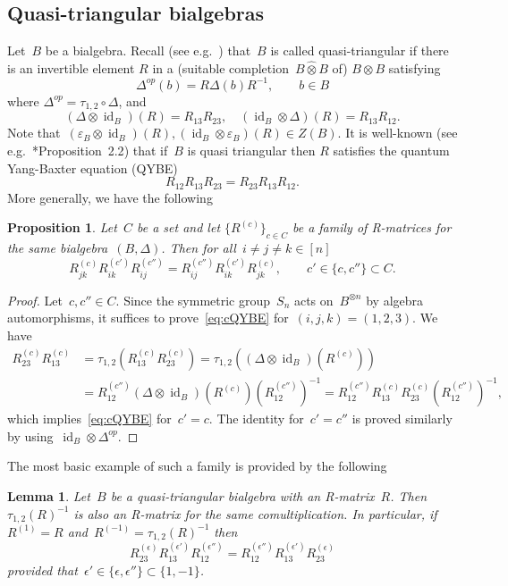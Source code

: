 \documentclass[12pt, reqno]{amsart}
\newcommand{\wh}[1]{\widehat{#1}}
\newtheorem{lemma}[theorem]{Lemma}
\newtheorem{proposition}[theorem]{Proposition}
\theoremstyle{definition}
\numberwithin{equation}{section}
\newcommand{\tensor}{\otimes}
\DeclareMathOperator{\id}{id}
\begin{document}
\subsection{Quasi-triangular bialgebras}
Let~$B$ be a bialgebra. Recall (see e.g.~\cites{Drinf,CPbook,RSTS,Majid}) that~$B$ is called quasi-triangular if there is an invertible element $R$ 
in a (suitable completion~$B\wh\tensor B$ of) $B\tensor B$ satisfying 
$$
\Delta^{op}(b)=R\Delta(b)R^{-1},\qquad b\in B
$$
where $\Delta^{op}=\tau_{1,2}\circ\Delta$,
and
$$
(\Delta\tensor \id_B)(R)=R_{13}R_{23},\quad 
(\id_B\tensor\Delta)(R)=R_{13}R_{12}.
$$
Note that~$(\varepsilon_B\tensor\id_B)(R),(\id_B\tensor\varepsilon_B)(R)\in Z(B)$.
It is well-known (see e.g.~\cite{RSTS}*{Proposition~2.2}) that if~$B$ is quasi triangular then
$R$ satisfies the quantum Yang-Baxter equation (QYBE)
\begin{equation}
R_{12}R_{13}R_{23}=R_{23}R_{13}R_{12}.\label{eq:QYBE}
\end{equation}
More generally, we have the following
\begin{proposition}\label{prop:cQYBE}
Let~$C$ be a set and let 
$\{R^{(c)}\}_{c\in C}$ be a family of R-matrices for the 
same bialgebra~$(B,\Delta)$. Then for all~$i\not=j\not=k\in[n]$
\begin{equation}\label{eq:cQYBE}
R_{jk}^{(c)}R_{ik}^{(c')}R_{ij}^{(c'')}=
R_{ij}^{(c'')}R_{ik}^{(c')}R_{jk}^{(c)},\qquad 
c'\in\{c,c''\}\subset C.
\end{equation} 
\end{proposition}
\begin{proof}
Let~$c,c''\in C$. Since the symmetric group~$S_n$
acts on~$B^{\tensor n}$ by algebra automorphisms, it suffices to prove~\eqref{eq:cQYBE}
for~$(i,j,k)=(1,2,3)$.
We have
\begin{align*}
R_{23}^{(c)}R_{13}^{(c)}&=\tau_{1,2}(R_{13}^{(c)}R_{23}^{(c)})=\tau_{1,2}((\Delta\tensor\id_B)(R^{(c)}))\\
&=R_{12}^{(c'')}(\Delta\tensor\id_B)(R^{(c)})(R_{12}^{(c'')})^{-1}=R_{12}^{(c'')}R_{13}^{(c)}R_{23}^{(c)}(R_{12}^{(c'')})^{-1},
\end{align*}
which implies~\eqref{eq:cQYBE} for~$c'=c$. The identity for~$c'=c''$ is proved similarly by using~$\id_B\tensor\Delta^{op}$.
\end{proof}
The most basic example of such a family is provided by the following
\begin{lemma}\label{lem:Rop inv}
Let~$B$ be a quasi-triangular bialgebra with an R-matrix~$R$.
Then~$\tau_{1,2}(R)^{-1}$ is also an R-matrix for the same comultiplication. In particular, if $R^{(1)}=R$ and~$R^{(-1)}=\tau_{1,2}(R)^{-1}$ then
$$
R_{23}^{(\epsilon)}R_{13}^{(\epsilon')}R_{12}^{(\epsilon'')}
=R_{12}^{(\epsilon'')}R_{13}^{(\epsilon')}R_{23}^{(\epsilon)}
$$
provided that~$\epsilon'\in\{\epsilon,\epsilon''\}\subset\{1,-1\}$.
\end{lemma}
\end{document}
